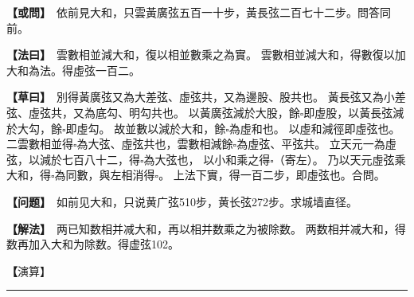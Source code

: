 \documentclass[11pt,a4paper]{article}
\let\origsquare\square
\renewcommand{\square}{\ensuremath{\origsquare}}%
\newcommand{\longline}{\noindent\rule{\textwidth}{0.4pt}}
\newcommand{\clOWEN}[1]{%
  \par\vspace{0.3em}%
  \noindent\textcolor{problemcolor}{\textbf{【或問】}}\,{\tradfont #1}\par\nopagebreak%
}
\newcommand{\mdOWEN}[1]{%
  \par\vspace{0.3em}%
  \noindent\textcolor{problemcolor}{\textbf{【问题】}}\,{\modfont #1}\par\nopagebreak%
}
\newcommand{\clFAYUE}[1]{%
  \par\noindent\textcolor{methodcolor}{\textbf{【法曰】}}\,{\tradfont #1}\par\nopagebreak%
}
\newcommand{\mdFAYUE}[1]{%
  \par\noindent\textcolor{methodcolor}{\textbf{【解法】}}\,{\modfont #1}\par\nopagebreak%
}
\newcommand{\clTSAOYUE}[1]{%
  \par\noindent\textcolor{workcolor}{\textbf{【草曰】}}\,{\tradfont #1}\par%
}
\newcommand{\mdTSAOYUE}[1]{%
  \par\noindent\textcolor{workcolor}{\textbf【演算】}}\,{\modfont #1}\par%
\begin{document}
\begin{paracol}{2}

\begin{leftcolumn}
\clOWEN{%
依前見大和，只雲黃廣弦五百一十步，黃長弦二百七十二步。問答同前。}

\clFAYUE{%
雲數相並減大和，復以相並數乘之為實。
雲數相並減大和，得數復以加大和為法。得虛弦一百二。}

\clTSAOYUE{%
別得黃廣弦又為大差弦、虛弦共，又為邊股、股共也。
黃長弦又為小差弦、虛弦共，又為底勾、明勾共也。
以黃廣弦減於大股，餘$\square$即虛股，以黃長弦減於大勾，餘$\square$即虛勾。
故並數以減於大和，餘$\square$為虛和也。
以虛和減徑即虛弦也。
二雲數相並得$\square$為大弦、虛弦共也，雲數相減餘$\square$為虛弦、平弦共。
立天元一為虛弦，以減於七百八十二，得$\square$為大弦也，
以小和乘之得$\square$（寄左）。
乃以天元虛弦乘大和，得$\square$為同數，與左相消得$\square$。
上法下實，得一百二步，即虛弦也。合問。}
\end{leftcolumn}

\switchcolumn

\begin{rightcolumn}
\mdOWEN{%
如前见大和，只说黄广弦510步，黄长弦272步。求城墙直径。}

\mdFAYUE{%
两已知数相并减大和，再以相并数乘之为被除数。
两数相并减大和，得数再加入大和为除数。得虚弦102。}

\mdTSAOYUE{%
辨识得：黄广弦又为大差弦、虚弦之和，又为边股、股之和。
黄长弦又为小差弦、虚弦之和，又为底勾、明勾之和。
以黄广弦减于大股余$\square$即虚股，以黄长弦减于大勾余$\square$即虚勾。
故两数相并以减于大和余$\square$为虚和。
以虚和减径即虚弦。
两已知数相并得$\square$为大弦、虚弦之和，相减余$\square$为虚弦、平弦之和。
设天元一为虚弦，从782中减去得$\square$为大弦，
乘小和得$\square$（寄左）。
以天元虚弦乘大和得$\square$为同数，与左式相消得$\square$。
上法下实，得102步即虚弦。符合所问。}
\end{rightcolumn}

\end{paracol}

\vspace{0.3cm}
\begin{center}\longline\end{center}
\end{document}
